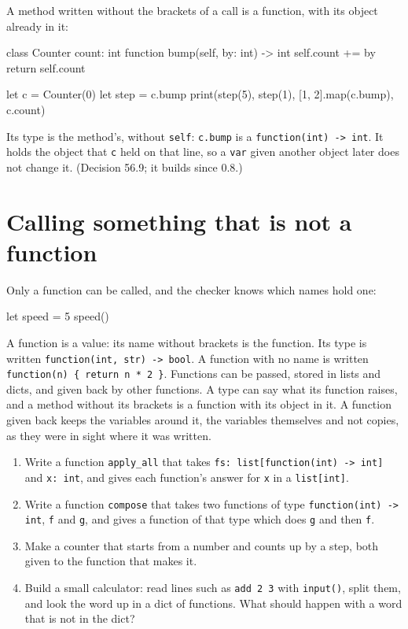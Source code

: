 A method written without the brackets of a call is a function, with
its object already in it:

\begin{zeno}
class Counter {
    count: int
    function bump(self, by: int) -> int {
        self.count += by
        return self.count
    }
}

let c = Counter(0)
let step = c.bump
print(step(5), step(1), [1, 2].map(c.bump), c.count)
\end{zeno}

Its type is the method's, without \verb|self|: \verb|c.bump| is a
\verb|function(int) -> int|. It holds the object that \verb|c| held on
that line, so a \verb|var| given another object later does not change
it. (Decision 56.9; it builds since 0.8.)

\section{Calling something that is not a function}

Only a function can be called, and the checker knows which names hold
one:

\begin{zeno}[fails=yes]
let speed = 5
speed()
\end{zeno}

\begin{summary}
A function is a value: its name without brackets is the function. Its
type is written \verb|function(int, str) -> bool|. A function with no
name is written \verb|function(n) { return n * 2 }|. Functions can be
passed, stored in lists and dicts, and given back by other functions.
A type can say what its function raises, and a method without its
brackets is a function with its object in it.
A function given back keeps the variables around it, the variables
themselves and not copies, as they were in sight where it was written.
\end{summary}

\begin{tryit}
\begin{enumerate}
\item Write a function \verb|apply_all| that takes
  \verb|fs: list[function(int) -> int]| and \verb|x: int|, and gives
  each function's answer for \verb|x| in a \verb|list[int]|.
\item Write a function \verb|compose| that takes two functions of type
  \verb|function(int) -> int|, \verb|f| and \verb|g|, and gives a
  function of that type which does \verb|g| and then \verb|f|.
\item Make a counter that starts from a number and counts up by a step,
  both given to the function that makes it.
\item Build a small calculator: read lines such as \verb|add 2 3| with
  \verb|input()|, split them, and look the word up in a dict of
  functions. What should happen with a word that is not in the dict?
\end{enumerate}
\end{tryit}
